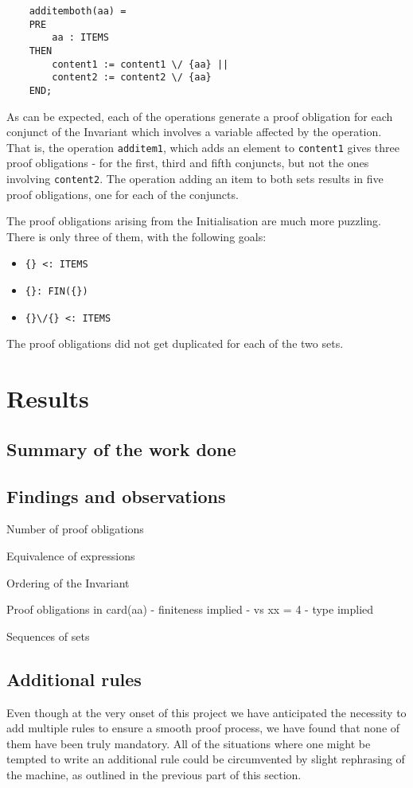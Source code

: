 \documentclass[11pt,journal]{IEEEtran}
\begin{document}
	\begin{lstlisting}
	additemboth(aa) =
	PRE
		aa : ITEMS
	THEN
		content1 := content1 \/ {aa} ||
		content2 := content2 \/ {aa}
	END;
	\end{lstlisting}
	
	As can be expected, each of the operations generate a proof obligation for each conjunct of the Invariant which involves a variable affected by the operation. That is, the operation \texttt{additem1}, which adds an element to \texttt{content1} gives three proof obligations - for the first, third and fifth conjuncts, but not the ones involving \texttt{content2}. The operation adding an item to both sets results in five proof obligations, one for each of the conjuncts.
	
	The proof obligations arising from the Initialisation are much more puzzling. There is only three of them, with the following goals:
	\begin{itemize}
		\item \verb|{} <: ITEMS |
		\item \verb|{}: FIN({}) |
		\item \verb|{}\/{} <: ITEMS|
	\end{itemize}
	The proof obligations did not get duplicated for each of the two sets.
	

	\section{Results}
	\subsection{Summary of the work done}
	
	
	\subsection{Findings and observations}
	Number of proof obligations
	
	Equivalence of expressions
	
	Ordering of the Invariant
	
	Proof obligations in card(aa) - finiteness implied - vs xx = 4 - type implied
	
	Sequences of sets
	
	\subsection{Additional rules}
	Even though at the very onset of this project we have anticipated the necessity to add multiple rules to ensure a smooth proof process, we have found that none of them have been truly mandatory. All of the situations where one might be tempted to write an additional rule could be circumvented by slight rephrasing of the machine, as outlined in the previous part of this section.
	
\end{document}
